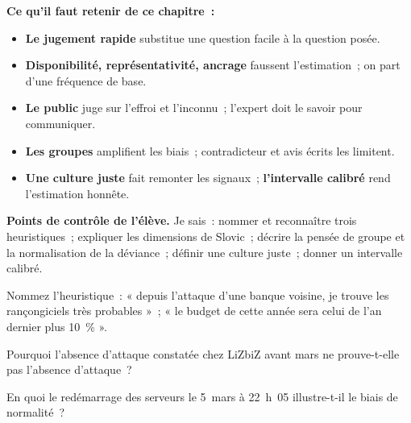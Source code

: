 \separateur

\begin{boxresume}
\textbf{Ce qu'il faut retenir de ce chapitre~:}
\begin{itemize}
    \item \textbf{Le jugement rapide} substitue une question facile à la
          question posée.
    \item \textbf{Disponibilité, représentativité, ancrage} faussent
          l'estimation~; on part d'une fréquence de base.
    \item \textbf{Le public} juge sur l'effroi et l'inconnu~; l'expert doit
          le savoir pour communiquer.
    \item \textbf{Les groupes} amplifient les biais~; contradicteur et avis
          écrits les limitent.
    \item \textbf{Une culture juste} fait remonter les signaux~;
          \textbf{l'intervalle calibré} rend l'estimation honnête.
\end{itemize}
\end{boxresume}

\begin{boxinfo}
\textbf{Points de contrôle de l'élève.} Je sais~: nommer et reconnaître
trois heuristiques~; expliquer les dimensions de Slovic~; décrire la
pensée de groupe et la normalisation de la déviance~; définir une culture
juste~; donner un intervalle calibré.
\end{boxinfo}

\bigskip

\begin{boxexo}[title={\ding{45}\quad Exercice~2.1. Quelle heuristique~? \niveaubase}]
Nommez l'heuristique~: « depuis l'attaque d'une banque voisine, je trouve
les rançongiciels très probables »~; « le budget de cette année sera celui
de l'an dernier plus 10~\% ».
\end{boxexo}

\begin{boxexo}[title={\ding{45}\quad Exercice~2.2. Fréquence de base \niveaubase}]
Pourquoi l'absence d'attaque constatée chez LiZbiZ avant mars ne prouve-t-elle
pas l'absence d'attaque~?
\end{boxexo}

\begin{boxexo}[title={\ding{45}\quad Exercice~2.3. Biais de normalité \niveaubase}]
En quoi le redémarrage des serveurs le 5~mars à 22~h~05 illustre-t-il le
biais de normalité~?
\end{boxexo}

